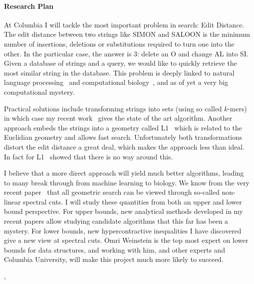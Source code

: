 \documentclass[10pt]{article}
\begin{document}

\paragraph{Research Plan}

At Columbia I will tackle the most important problem in search: Edit Distance.
The edit distance between two strings like SIMON and SALOON is the minimum number of insertions, deletions or substitutions required to turn one into the other.
In the particular case, the answer is 3: delete an O and change AL into SI.
Given a database of strings and a query, we would like to quickly retrieve the most similar string in the database.
This problem is deeply linked to natural language processing~\cite{sidorov2015computing}
and computational biology~\cite{mcgrane2016biological}, and as of yet a very big computational mystery.

Practical solutions include transforming strings into sets (using so called $k$-mers) in which case my recent work~\cite{ahle2019subsets} gives the state of the art algorithm.
Another approach embeds the strings into a geometry called L1~\cite{jowhari2012efficient, ostrovsky2005low} which is related to the Euclidian geometry and allows fast search.
Unfortunately both transformations distort the edit distance a great deal, which makes the approach less than ideal.
In fact for L1~\cite{krauthgamer2009improved} showed that there is no way around this.

I believe that a more direct approach will yield much better algorithms, leading to many break through from machine learning to biology.
We know from the very recent paper~\cite{andoni2018data} that all geometric search can be viewed through so-called non-linear spectral cuts.
I will study these quantities from both an upper and lower bound perspective.
For upper bounds, new analytical methods developed in my recent papers allow studying candidate algorithms that this far has been a mystery.
For lower bounds, new hypercontractive inequalities I have discovered give a new view at spectral cuts.
Omri Weinstein is the top most expert on lower bounds for data structures, and working with him, and other experts and Columbia University, will make this project much more likely to succeed.

\clearpage
,
\vspace{2cm}


\end{document}
